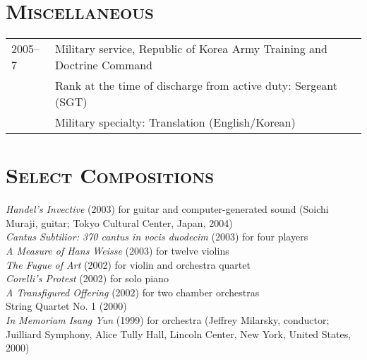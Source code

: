 \documentclass[a4paper,11pt]{article}
\begin{document}
  \section*{\textsc{Miscellaneous}}
  
  \hspace*{-0.25cm}
  \begin{tabular}{p{2.5cm} l}
    2005–7 & Military service, Republic of Korea Army Training and Doctrine Command\\
    & Rank at the time of discharge from active duty: Sergeant (SGT)\\
    & Military specialty: Translation (English/Korean)
  \end{tabular}
  
  \section*{\textsc{Select Compositions}}
  
  \begin{hangparas}{15pt}{1}
    \textit{Handel’s Invective} (2003) for guitar and computer-generated sound (Soichi Muraji, guitar; Tokyo Cultural Center, Japan, 2004)\\[2mm]
  
    \textit{Cantus Subtilior: 370 cantus in vocis duodecim} (2003) for four players\\[2mm]
  
    \textit{A Measure of Hans Weisse} (2003) for twelve violins\\[2mm]
  
    \textit{The Fugue of Art} (2002) for violin and orchestra quartet\\[2mm]
  
    \textit{Corelli’s Protest} (2002) for solo piano\\[2mm]
  
    \textit{A Transfigured Offering} (2002) for two chamber orchestras\\[2mm]
  
    String Quartet No. 1 (2000)\\[2mm]
  
    \textit{In Memoriam Isang Yun} (1999) for orchestra (Jeffrey Milarsky, conductor; Juilliard Symphony, Alice Tully Hall, Lincoln Center, New York, United States, 2000)
  \end{hangparas}
\end{document}
